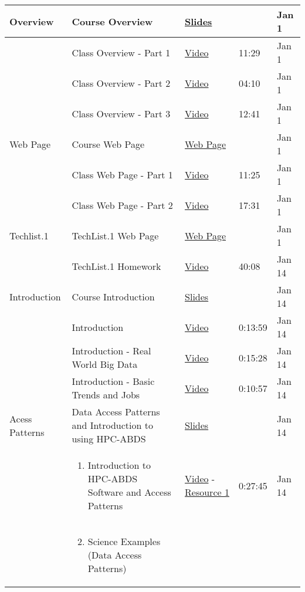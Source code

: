 \begin{longtable}{|*{5}{p{}|}}
Overview
&
Course Overview
&
\href{https://drive.google.com/file/d/0Bx\_sUfI4VkKSaHlDWkZkeGh4LVE/view?usp=sharing}{Slides}
&&
Jan 1
\\
\hline&
Class Overview - Part 1
&
\href{https://www.youtube.com/watch?v=Z2M5NsTsj2Y}{Video}
&
11:29
&
Jan 1
\\
\hline&
Class Overview - Part 2
&
\href{https://www.youtube.com/watch?v=5VXhF\_Z7Vdk}{Video}
&
04:10
&
Jan 1
\\
\hline&
Class Overview - Part 3
&
\href{https://www.youtube.com/watch?v=DDXqLZcavas}{Video}
&
12:41
&
Jan 1
\\
\hline
Web Page
&
Course Web Page
&
\href{https://cloudmesh.github.io/classes/index.html}{Web Page}
&&
Jan 1
\\
\hline&
Class Web Page - Part 1
&
\href{https://www.youtube.com/watch?v=uE45GE1Ceok}{Video}
&
11:25
&
Jan 1
\\
\hline&
Class Web Page - Part 2
&
\href{https://www.youtube.com/watch?v=Tkhu96TreMk}{Video}
&
17:31
&
Jan 1
\\
\hline
Techlist.1
&
TechList.1 Web Page
&
\href{https://cloudmesh.github.io/classes/i524/technologies.html}{Web Page}
&&
Jan 1
\\
\hline&
TechList.1 Homework
&
\href{https://www.youtube.com/watch?v=roi7vezNmfo}{Video}
&
40:08
&
Jan 14
\\
\hline
Introduction
&
Course Introduction
&
\href{https://drive.google.com/file/d/0Bx\_sUfI4VkKSMHBUblVUMWg4Y00/view?usp=sharing}{Slides}
&&
Jan 14
\\
\hline&
Introduction
&
\href{https://www.youtube.com/watch?v=VWK7QdThOPQ}{Video}
&
0:13:59
&
Jan 14
\\
\hline&
Introduction - Real World Big Data
&
\href{https://www.youtube.com/watch?v=hjrFaXMU1dg\&list=PLLO4AVszo1SNIGlqjEBaQjLvc3lgpeI3M\&index=2}{Video}
&
0:15:28
&
Jan 14
\\
\hline&
Introduction - Basic Trends and Jobs
&
\href{https://www.youtube.com/watch?v=u5Y0aKbzync\&index=3\&list=PLLO4AVszo1SNIGlqjEBaQjLvc3lgpeI3M}{Video}
&
0:10:57
&
Jan 14
\\
\hline
Acess Patterns
&
Data Access Patterns and Introduction to using HPC-ABDS
&
\href{https://iu.box.com/s/o5rqlsop0jv98lqdon3h9qszk3soq31g}{Slides}
&&
Jan 14
\\
\hline&\begin{enumerate}
\item {} 
Introduction to HPC-ABDS Software and Access Patterns

\end{enumerate}
&
\href{https://www.youtube.com/watch?v=6Kj9E38lUzU}{Video} -  \href{http://grids.ucs.indiana.edu/ptliupages/publications/HPC-ABDSDescribedv2.pdf}{Resource 1}
&
0:27:45
&
Jan 14
\\
\hline&\begin{enumerate}
\setcounter{enumi}{1}
\item {} 
Science Examples (Data Access Patterns)


\end{enumerate}
\end{longtable}
